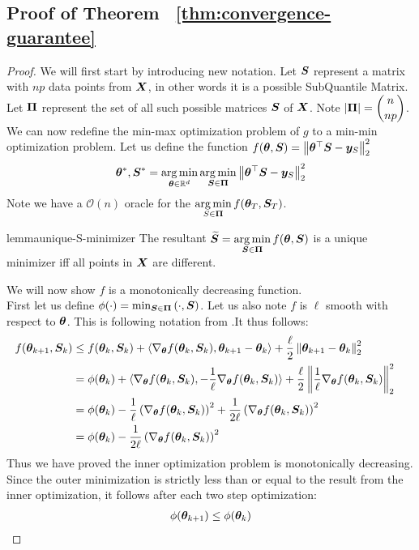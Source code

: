 \documentclass{article} %
\newcommand{\norm}[1]{\left\lVert#1\right\rVert}
\begin{document}
\begin{appendices}
	\subsection{Proof of Theorem ~\ref{thm:convergence-guarantee}}
	\begin{proof}
	We will first start by introducing new notation. Let ${\bm{S}}$ represent a matrix with $np$ data points from ${\bm{X}}$, in other words it is a possible SubQuantile Matrix. Let $\displaystyle{\bm{\Pi}}$ represent the set of all such possible matrices ${\bm{S}}$ of ${\bm{X}}$. Note $\displaystyle \left|{\bm{\Pi}}\right| = \binom{n}{np}$. We can now redefine the min-max optimization problem of $g$ to a min-min optimization problem. Let us define the function $f(\vtheta, \mS) = \norm{\vtheta^\top\mS - \vy_S}_2^2$
	\begin{equation}
		\vtheta^*, \mS^* = \argmin_{\vtheta \in \mathbb{R}^d} \argmin_{\mS \in \vPi} \norm{\vtheta^\top\mS - \vy_S}_2^2
	\end{equation}
	Note we have a $\mathcal{O}(n)$ oracle for the $\displaystyle \operatorname*{arg\,min}_{S\in {\bm{\Pi}}}f({\bm{\theta}}_T,{\bm{S}}_T)$. 
	\begin{restatable}{lemma}{unique-S-minimizer}
		\label{lem:unique-S-minimizer}
		The resultant $\displaystyle \widetilde{{\bm{S}}} = \operatorname*{arg\,min}_{{\bm{S}} \in {\bm{\Pi}}} f({\bm{\theta}},{\bm{S}})$ is a unique minimizer iff all points in ${\bm{X}}$ are different. 
	\end{restatable}
	We will now show $f$ is a monotonically decreasing function.\\
	First let us define $\phi(\cdot) = \min_{{\bm{S}} \in {\bm{\Pi}}}\left(\cdot,{\bm{S}}\right)$. 
	Let us also note $f$ is $\ell$ smooth with respect to ${\bm{\theta}}$. This is following notation from \cite{Jin_2019}.It thus follows:
	\begin{align*}
		f(\vtheta_{k+1}, \mS_k) &\leq f(\vtheta_k, \mS_k) + \langle\nabla_\vtheta f(\vtheta_k,\mS_k), \vtheta_{k+1}-\vtheta_k \rangle + \frac{\ell}{2}\norm{\vtheta_{k+1}-\vtheta_k}_2^2 &&\\
		&= \phi(\vtheta_k) + \langle\nabla_\vtheta f(\vtheta_k,\mS_k), -\frac{1}{\ell}\nabla_\vtheta f(\vtheta_k,\mS_k)\rangle + \frac{\ell}{2}\norm{\frac{1}{\ell}\nabla_\vtheta f(\vtheta_k,\mS_k)}_2^2 &&\\
		&= \phi(\vtheta_k) - \frac{1}{\ell}\left(\nabla_\vtheta f(\vtheta_k,\mS_k)\right)^2 + \frac{1}{2\ell}\left(\nabla_\vtheta f(\vtheta_k,\mS_k)\right)^2 &&\\
		&= \phi(\vtheta_k) - \frac{1}{2\ell}\left(\nabla_\vtheta f(\vtheta_k,\mS_k)\right)^2 &&\\
	\end{align*} 
	Thus we have proved the inner optimization problem is monotonically decreasing. Since the outer minimization is strictly less than or equal to the result from the inner optimization, it follows after each two step optimization: 
	\begin{align*}
		\phi({\bm{\theta}}_{k+1}) \leq \phi({\bm{\theta}}_k)
	\end{align*}
	

\end{proof}
\end{appendices}
\end{document}

